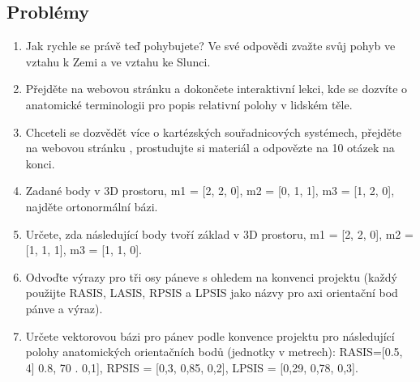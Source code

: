 \documentclass[letterpaper,10pt,english]{jupyterBook}
\begin{document}
\subsection{Problémy}
\label{\detokenize{Prednasky/0_3_Sou_u0159adnicov_xe9_syst_xe9my:problemy}}\begin{enumerate}
%
\item {} 
\sphinxAtStartPar
Jak rychle se právě teď pohybujete? Ve své odpovědi zvažte svůj pohyb ve vztahu k Zemi a ve vztahu ke Slunci.

\item {} 
\sphinxAtStartPar
Přejděte na webovou stránku  a dokončete interaktivní lekci, kde se dozvíte o anatomické terminologii pro popis relativní polohy v lidském těle.

\item {} 
\sphinxAtStartPar
Chcete\sphinxhyphen{}li se dozvědět více o kartézských souřadnicových systémech, přejděte na webovou stránku , prostudujte si materiál a odpovězte na 10 otázek na konci.

\item {} 
\sphinxAtStartPar
Zadané body v 3D prostoru, m1 = {[}2, 2, 0{]}, m2 = {[}0, 1, 1{]}, m3 = {[}1, 2, 0{]}, najděte ortonormální bázi.

\item {} 
\sphinxAtStartPar
Určete, zda následující body tvoří základ v 3D prostoru, m1 = {[}2, 2, 0{]}, m2 = {[}1, 1, 1{]}, m3 = {[}1, 1, 0{]}.

\item {} 
\sphinxAtStartPar
Odvoďte výrazy pro tři osy páneve s ohledem na konvenci projektu  (každý použijte RASIS, LASIS, RPSIS a LPSIS jako názvy pro axi orientační bod pánve a výraz).

\item {} 
\sphinxAtStartPar
Určete vektorovou bázi pro pánev podle konvence projektu  pro následující polohy anatomických orientačních bodů (jednotky v metrech): RASIS={[}0.5, 4{]} 0.8, 70 . 0,1{]}, RPSIS = {[}0,3, 0,85, 0,2{]}, LPSIS = {[}0,29, 0,78, 0,3{]}.

\end{enumerate}
\end{document}
